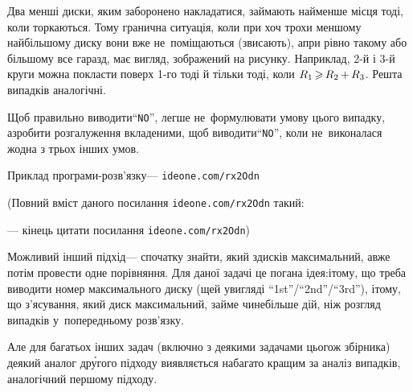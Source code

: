 \documentclass[14pt,a4paper]{extarticle}
\def\dib#1{\,#1\discretionary{}{\mbox{$#1$}}{}\,}
\renewcommand{\baselinestretch}{1.3125}
\begin{document}
\Tutorial
Два менші диски, яким заборонено накладатися, займають найменше місця тоді, коли торкаються. 
Тому гранична ситуація, коли при хоч трохи меншому найбільшому диску вони вже не~поміщаються (звисають), а\nolinebreak[3] при рівно такому або більшому все гаразд, має вигляд, зображений на рисунку. Наприклад, \mbox{2-й} і \mbox{3-й} круги можна покласти поверх \mbox{1-го} тоді й тільки тоді, коли $R_1\dib{{\>}}R_2\dib{{+}}R_3$. Решта випадків аналогічні.

Щоб правильно виводити\nolinebreak[3] ``\texttt{NO}'', легше не~формулювати умову цього випадку, а\nolinebreak[3] зробити розгалуження вкладеними, щоб виводити\nolinebreak[3] ``\texttt{NO}'', коли не~виконалася жодна з трьох інших умов.

Приклад програми-розв'язку\nolinebreak[3] --- 
\verb"ideone.com/rx2Odn"


{\color{green}\begin{small}

\renewcommand{\baselinestretch}{0.875}

(Повний вміст даного посилання \verb"ideone.com/rx2Odn" такий:

--- кінець цитати посилання \verb"ideone.com/rx2Odn")

\end{small}}




Можливий інший підхід\nolinebreak[3] --- спочатку знайти, який з\nolinebreak[3] дисків максимальний, а\nolinebreak[3] вже потім провести одне порівняння. Для даної задачі це погана ідея:\linebreak[1] і\nolinebreak[3] тому, що треба виводити номер максимального диску (ще\nolinebreak[3] й у\nolinebreak[3] вигляді ``1st''/``2nd''/``3rd''), і\nolinebreak[3] тому, що з'ясування, який диск максимальний, займе чи\nolinebreak[3] не\nolinebreak[3] більше дій, ніж розгляд випадків у~попередньому розв'язку.

Але для багатьох інших задач (включно з деякими задачами цього\nolinebreak[3] ж збірника) \mbox{деякий} аналог др\'{у}гого підходу виявляється набагато кращим за аналіз випадків, аналогічний першому підходу.
\end{document}
